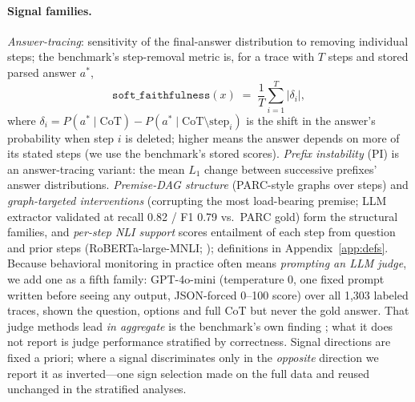 \documentclass[11pt]{article}
\begin{document}
\paragraph{Signal families.} \emph{Answer-tracing}: sensitivity of the final-answer distribution to removing individual steps; the benchmark's step-removal metric is, for a trace with $T$ steps and stored parsed answer $a^{\ast}$,
\begin{equation}\label{eq:soft}
\texttt{soft\_faithfulness}(x) \;=\; \frac{1}{T}\sum_{i=1}^{T}\lvert \delta_i \rvert,
\end{equation}
where $\delta_i = P(a^{\ast}\!\mid\!\mathrm{CoT}) - P(a^{\ast}\!\mid\!\mathrm{CoT}\setminus\mathrm{step}_i)$ is the shift in the answer's probability when step $i$ is deleted; higher means the answer depends on more of its stated steps (we use the benchmark's stored scores). \emph{Prefix instability} (PI) is an answer-tracing variant: the mean $L_1$ change between successive prefixes' answer distributions. \emph{Premise-DAG structure} (PARC-style graphs over steps) and \emph{graph-targeted interventions} (corrupting the most load-bearing premise; LLM extractor validated at recall 0.82 / F1 0.79 vs.\ PARC gold) form the structural families, and \emph{per-step NLI support} scores entailment of each step from question and prior steps (RoBERTa-large-MNLI; \citealp{liu2019roberta,williams2018mnli}); definitions in Appendix~\ref{app:defs}. Because behavioral monitoring in practice often means \emph{prompting an LLM judge}, we add one as a fifth family: GPT-4o-mini (temperature 0, one fixed prompt written before seeing any output, JSON-forced 0--100 score) over all 1{,}303 labeled traces, shown the question, options and full CoT but never the gold answer. That judge methods lead \emph{in aggregate} is the benchmark's own finding \citep{shen2026faithcot}; what it does not report is judge performance stratified by correctness. Signal directions are fixed a priori; where a signal discriminates only in the \emph{opposite} direction we report it as inverted---one sign selection made on the full data and reused unchanged in the stratified analyses.
\end{document}
